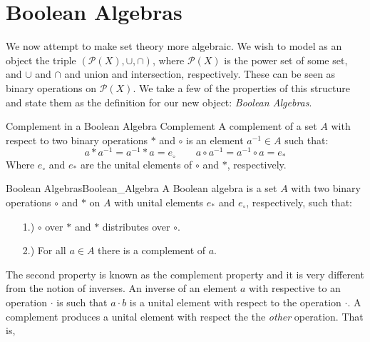 \section{Boolean Algebras}
    \label{sec:Boolean_Algebra}%
    We now attempt to make set theory more algebraic. We wish to model
    as an object the triple $(\mathcal{P}(X),\cup,\cap)$, where
    $\mathcal{P}(X)$ is the \gls{power set} of some set, and $\cup$ and
    $\cap$ and union and intersection, respectively. These can be seen as
    binary operations on $\mathcal{P}(X)$. We take a few of the properties
    of this structure and state them as the definition for our new object:
    \textit{Boolean Algebras}.
    \begin{fdefinition}{Complement in a Boolean Algebra}
                       {Complement}
        A complement of a \gls{set} $A$ with respect to two
        \glspl{binary operation} $*$ and $\circ$ is an element
        $a^{\minus{1}}\in{A}$ such that:
        \begin{equation*}
            a*a^{\minus{1}}=a^{\minus{1}}*a=e_{\circ}
            \quad\quad
            a\circ{a}^{\minus{1}}=a^{\minus{1}}\circ{a}=e_{*}
        \end{equation*}
        Where $e_{\circ}$ and $e_{*}$ are the \glspl{unital element} of
        $\circ$ and $*$, respectively.
    \end{fdefinition}
    \begin{fdefinition}{Boolean Algebras}{Boolean_Algebra}
        A Boolean algebra is a set $A$ with two
         \glspl{binary operation}
        $\circ$ and $*$ on $A$ with \glspl{unital element} $e_{*}$ and
        $e_{\circ}$, respectively, such that:
        \begin{itemize}
            \item[1.)]  $\circ$ 
                        over $*$ and $*$ distributes over $\circ$.
            \item[2.)]  For all $a\in{A}$ there is a complement of $a$.
        \end{itemize}
    \end{fdefinition}
    The second property is known as the complement property and it is very
    different from the notion of inverses. An inverse of an element $a$ with
    respective to an operation $\cdot$ is such that $a\cdot{b}$ is a unital
    element with respect to the operation $\cdot$. A complement produces a
    unital element with respect the the \textit{other} operation. That is,
